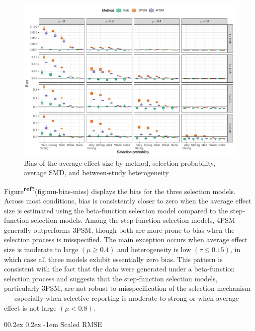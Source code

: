 \documentclass[
  american,
  man, donotrepeattitle,floatsintext]{apa7}
\makeatletter
\let\oldparagraph\paragraph
\renewcommand{\paragraph}{
    \@ifstar
      \xxxParagraphStar
      \xxxParagraphNoStar
  }
\newcommand{\xxxParagraphStar}[1]{\oldparagraph*{#1}\mbox{}}
\newcommand{\xxxParagraphNoStar}[1]{\oldparagraph{#1}\mbox{}}
\renewcommand{\paragraph}{\@startsection{paragraph}{4}{\parindent}%
  {0\baselineskip \@plus 0.2ex \@minus 0.2ex}%
  {-1em}%
  {\normalfont\normalsize\bfseries\itshape\typesectitle}}
\makeatother
\begin{document}
\begin{figure}
\includegraphics{beta-function-selection-models-with-dependent-effects_files/figure-latex/mu-bias-miss-1} \caption{Bias of the average effect size by method, selection probability, average SMD, and between-study heterogeneity}\label{fig:mu-bias-miss}
\end{figure}

Figure\textsuperscript{\textbf{ref?}}(fig:mu-bias-miss) displays the bias for the three selection models. Across most conditions, bias is consistently closer to zero when the average effect size is estimated using the beta-function selection model compared to the step-function selection models. Among the step-function selection models, 4PSM generally outperforms 3PSM, though both are more prone to bias when the selection process is misspecified. The main exception occurs when average effect size is moderate to large \((\mu \geq 0.4)\) and heterogeneity is low \((\tau \leq 0.15)\), in which case all three models exhibit essentially zero bias. This pattern is consistent with the fact that the data were generated under a beta-function selection process and suggests that the step-function selection models, particularly 3PSM, are not robust to misspecification of the selection mechanism-----especially when selective reporting is moderate to strong or when average effect is not large \((\mu < 0.8)\).

\paragraph{Scaled RMSE}\label{scaled-rmse-1}
\end{document}
